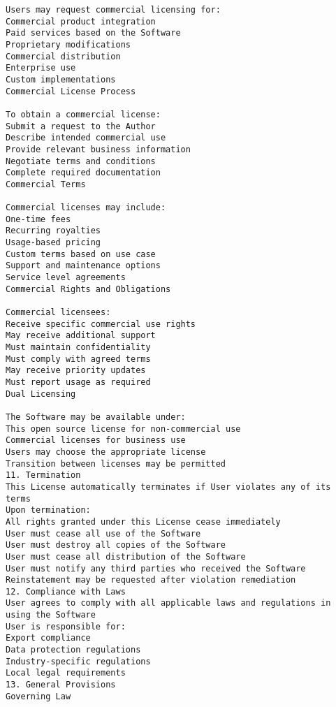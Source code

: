 \begin{verbatim}
Users may request commercial licensing for:
Commercial product integration
Paid services based on the Software
Proprietary modifications
Commercial distribution
Enterprise use
Custom implementations
Commercial License Process

To obtain a commercial license:
Submit a request to the Author
Describe intended commercial use
Provide relevant business information
Negotiate terms and conditions
Complete required documentation
Commercial Terms

Commercial licenses may include:
One-time fees
Recurring royalties
Usage-based pricing
Custom terms based on use case
Support and maintenance options
Service level agreements
Commercial Rights and Obligations

Commercial licensees:
Receive specific commercial use rights
May receive additional support
Must maintain confidentiality
Must comply with agreed terms
May receive priority updates
Must report usage as required
Dual Licensing

The Software may be available under:
This open source license for non-commercial use
Commercial licenses for business use
Users may choose the appropriate license
Transition between licenses may be permitted
11. Termination
This License automatically terminates if User violates any of its terms
Upon termination:
All rights granted under this License cease immediately
User must cease all use of the Software
User must destroy all copies of the Software
User must cease all distribution of the Software
User must notify any third parties who received the Software
Reinstatement may be requested after violation remediation
12. Compliance with Laws
User agrees to comply with all applicable laws and regulations in using the Software
User is responsible for:
Export compliance
Data protection regulations
Industry-specific regulations
Local legal requirements
13. General Provisions
Governing Law


\end{verbatim}
